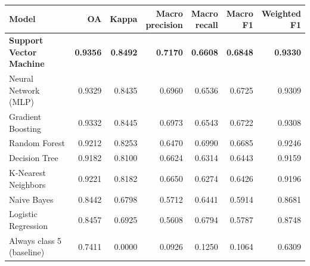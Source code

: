 \begin{tabular}{lrrrrrr}
\toprule
Model & OA & Kappa & \makecell{Macro\\precision} & \makecell{Macro\\recall} & \makecell{Macro\\F1} & \makecell{Weighted\\F1} \\
\midrule
\textbf{Support Vector Machine} & \textbf{0.9356} & \textbf{0.8492} & \textbf{0.7170} & \textbf{0.6608} & \textbf{0.6848} & \textbf{0.9330} \\
Neural Network (MLP) & 0.9329 & 0.8435 & 0.6960 & 0.6536 & 0.6725 & 0.9309 \\
Gradient Boosting & 0.9332 & 0.8445 & 0.6973 & 0.6543 & 0.6722 & 0.9308 \\
Random Forest & 0.9212 & 0.8253 & 0.6470 & 0.6990 & 0.6685 & 0.9246 \\
Decision Tree & 0.9182 & 0.8100 & 0.6624 & 0.6314 & 0.6443 & 0.9159 \\
K-Nearest Neighbors & 0.9221 & 0.8182 & 0.6650 & 0.6274 & 0.6426 & 0.9196 \\
Naive Bayes & 0.8442 & 0.6798 & 0.5712 & 0.6441 & 0.5914 & 0.8681 \\
Logistic Regression & 0.8457 & 0.6925 & 0.5608 & 0.6794 & 0.5787 & 0.8748 \\
\midrule
Always class 5 (baseline) & 0.7411 & 0.0000 & 0.0926 & 0.1250 & 0.1064 & 0.6309 \\
\bottomrule
\end{tabular}
